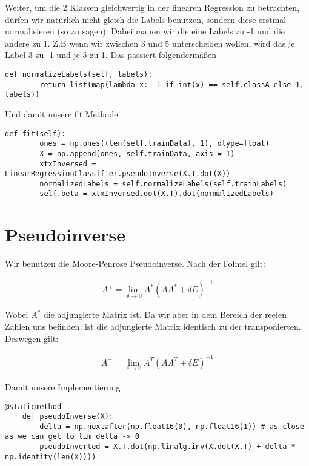 Weiter, um die 2 Klassen gleichwertig in der linearen Regression zu betrachten, dürfen wir natürlich nicht gleich die Labels benutzen, sondern
diese erstmal normalisieren (so zu sagen). Dabei mapen wir die eine Labels zu -1 und die andere zu 1. Z.B wenn wir zwischen 3 und 5 unterscheiden wollen,
wird das je Label 3 zu -1 und je 5 zu 1. Das passiert folgendermaßen

\begin{lstlisting}[style=py]
	def normalizeLabels(self, labels):
		return list(map(lambda x: -1 if int(x) == self.classA else 1, labels))
\end{lstlisting}

Und damit unsere fit Methode

\begin{lstlisting}[style=py]
	def fit(self):
		ones = np.ones((len(self.trainData), 1), dtype=float)
		X = np.append(ones, self.trainData, axis = 1)
		xtxInversed = LinearRegressionClassifier.pseudoInverse(X.T.dot(X))
		normalizedLabels = self.normalizeLabels(self.trainLabels)
		self.beta = xtxInversed.dot(X.T).dot(normalizedLabels)
\end{lstlisting}

\section*{Pseudoinverse}
Wir benutzen die Moore-Penrose Pseudoinverse. Nach der Folmel gilt:

\begin{align}
	A^{+} = \lim_{\delta \rightarrow 0} A^{*}(AA^{*} + \delta E)^{-1}
\end{align}

Wobei $A^{*}$ die adjungierte Matrix ist. Da wir aber in dem Bereich der reelen Zahlen uns befinden, ist die adjungierte Matrix
identisch zu der transponierten. Deswegen gilt:

\begin{align}
	A^{+} = \lim_{\delta \rightarrow 0} A^{T}(AA^{T} + \delta E)^{-1}
\end{align}

Damit unsere Implementierung

\begin{lstlisting}[style=py]
@staticmethod
	def pseudoInverse(X):
		delta = np.nextafter(np.float16(0), np.float16(1)) # as close as we can get to lim delta -> 0
		pseudoInverted = X.T.dot(np.linalg.inv(X.dot(X.T) + delta * np.identity(len(X))))
\end{lstlisting}


